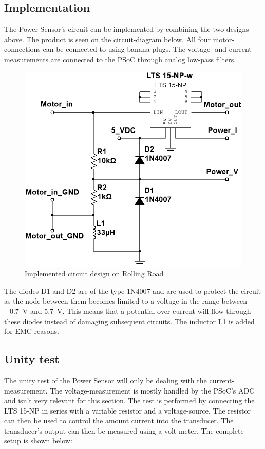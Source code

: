 \subsection{Implementation}
The Power Sensor's circuit can be implemented by combining the two designs above. The product is seen on the circuit-diagram below. All four motor-connections can be connected to using banana-plugs. The voltage- and current-measurements are connected to the PSoC through analog low-pass filters.

\begin{figure}[H]
	\centering
	\includegraphics[width=0.7\linewidth]{Hardware/Pictures/PowerSensor_circuit}
	\caption{Implemented circuit design on Rolling Road}
	\label{fig:PowerSensor_circuit}
\end{figure}

The diodes D1 and D2 are of the type 1N4007 and are used to protect the circuit as the node between them becomes limited to a voltage in the range between \SI{-0.7}{\volt} and \SI{5.7}{\volt}. This means that a potential over-current will flow through these diodes instead of damaging subsequent circuits. The inductor L1 is added for EMC-reasons\cite{EMC}.

\subsection{Unity test}
\label{sec:PowerSensorTest}
The unity test of the Power Sensor will only be dealing with the current-measurement. The voltage-measurement is mostly handled by the PSoC's ADC and isn't very relevant for this section. The test is performed by connecting the LTS 15-NP in series with a variable resistor and a voltage-source. The resistor can then be used to control the amount current into the transducer. The transducer's output can then be measured using a volt-meter. The complete setup is shown below:

